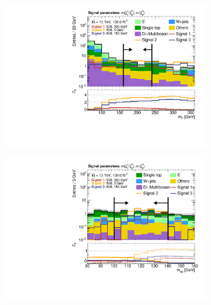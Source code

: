 \begin{figure}
\begin{subfigure}[b]{0.4\linewidth}
		\centering\includegraphics[width=\textwidth]{n1_SRMM_mct_bins/mt_both.pdf}
		\caption{\label{fig:Wh_reopt_second_round_n1_srmm_mbb_lower}}
	\end{subfigure}%
	\begin{subfigure}[b]{0.4\linewidth}
		\centering\includegraphics[width=\textwidth]{n1_SRMM_mct_bins/mbb_both.pdf}
		\caption{\label{fig:Wh_reopt_second_round_n1_srmm_mbb_upper}}
	\end{subfigure}
	\begin{subfigure}[b]{0.4\linewidth}

\end{subfigure}
\end{figure}
